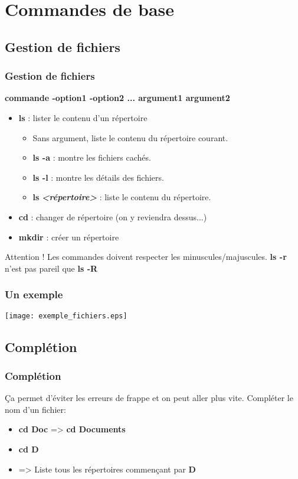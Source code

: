\documentclass{beamer}
\begin{document}
    \section{Commandes de base}
    \subsection{Gestion de fichiers}
    \begin{frame}
        \frametitle{Gestion de fichiers}
        {\bf commande -option1 -option2 ... argument1 argument2}
        \begin{itemize}
            \item {\bf ls} : lister le contenu d'un répertoire
                \begin{itemize}
                    \item Sans argument, liste le contenu du répertoire courant.
                    \item {\bf ls -a} : montre les fichiers cachés.
                    \item {\bf ls -l} : montre les détails des fichiers.
                    \item {\bf ls }{\bf {\it<répertoire>}} : liste le contenu du répertoire.
                \end{itemize}
            \item {\bf cd} : changer de répertoire (on y reviendra dessus...)
            \item {\bf mkdir} : créer un répertoire
        \end{itemize}
        \begin{block}{Attention !}
            Les commandes doivent respecter les minuscules/majuscules.\newline
            {\bf ls -r} n'est pas pareil que {\bf ls -R}
        \end{block}
    \end{frame}

    \begin{frame}
        \frametitle{Un exemple}
        \texttt{[image: exemple\_fichiers.eps]}
    \end{frame}

    \subsection{Complétion}
    \begin{frame}
        \frametitle{Complétion}
        Ça permet d'éviter les erreurs de frappe et on peut aller plus vite.\newline \newline
        Compléter le nom d'un fichier:
        \begin{itemize}
            \item {\bf cd Doc} \Tab => {\bf cd Documents}
            \item {\bf cd D} \Tab \Tab
            \item => Liste tous les répertoires commençant par {\bf D}
        \end{itemize}
    \end{frame}
\end{document}
